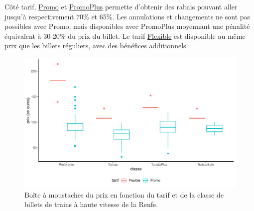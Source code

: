\documentclass[
  11pt,
  letterpaper,
]{scrbook}
\theoremstyle{definition}
\theoremstyle{remark}
\begin{document}
Côté tarif,
\href{http://web.archive.org/web/20161111134241/http://www.renfe.com/viajeros/tarifas/billete_promo.html}{Promo}
et
\href{http://web.archive.org/web/20161110220249/http://www.renfe.com/viajeros/tarifas/billete_promoplus.html}{PromoPlus}
permette d'obtenir des rabais pouvant aller jusqu'à respectivement 70\%
et 65\%. Les annulations et changements ne sont pas possibles avec
Promo, mais disponibles avec PromoPlus moyennant une pénalité équivalent
à 30-20\% du prix du billet. Le tarif
\href{http://web.archive.org/web/20161108192609/http://www.renfe.com/viajeros/tarifas/billete_flexible.html}{Flexible}
est disponible au même prix que les billets réguliers, avec des
bénéfices additionnels.

\begin{figure}[ht!]

{\centering \includegraphics[width=1\textwidth,height=\textheight]{./01-analyseexploratoire_files/figure-pdf/fig-renfe-aed6-1.pdf}

}

\caption{\label{fig-renfe-aed6}Boîte à moustaches du prix en fonction du
tarif et de la classe de billets de trains à haute vitesse de la Renfe.}

\end{figure}
\end{document}
